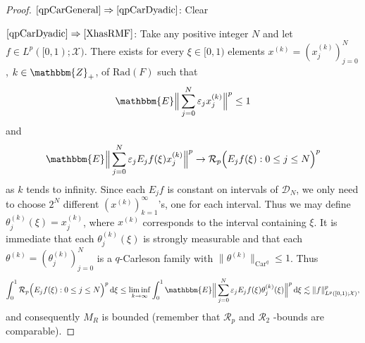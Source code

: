 \documentclass[a4paper,10pt]{amsart}
\theoremstyle{plain}
\theoremstyle{definition}
\theoremstyle{remark}
\begin{document}
\begin{proof}
     $\eqref{qpCarGeneral}\Rightarrow\eqref{qpCarDyadic}$: Clear

    $\eqref{qpCarDyadic}\Rightarrow\eqref{XhasRMF}$: Take any positive integer $N$ and let
    $f\in L^p([0,1) ; \mathcal{X})$. There exists for every $\xi\in [0,1)$ elements
    $x^{(k)} = (x_j^{(k)})_{j=0}^N$, $k\in{\mathbbm{Z}}_+$, of $\text{Rad}(F)$ such that
    \begin{equation*}
      {\mathbbm{E}} \Big\| \sum_{j=0}^N \varepsilon_j x_j^{(k)} \Big\|^p \leq 1
    \end{equation*}
    and
    \begin{equation*}
      {\mathbbm{E}} \Big\| \sum_{j=0}^N \varepsilon_j E_j f(\xi ) x_j^{(k)} \Big\|^p \to
      \mathcal{R}_p \Big( E_j f(\xi ) : 0\leq j \leq N \Big) ^p
    \end{equation*}
    as $k$ tends to infinity. Since each $E_jf$ is constant on intervals of $\mathcal{D}_N$, we only need to choose
    $2^N$ different $(x^{(k)})_{k=1}^{\infty}$'s, one for each interval. Thus we may define
    $\theta_j^{(k)}(\xi ) = x_j^{(k)}$, where $x^{(k)}$ corresponds to the interval containing $\xi$.
    It is immediate that each $\theta_j^{(k)}(\xi )$ is strongly measurable and that each
    $\theta^{(k)} = (\theta_j^{(k)})_{j=0}^N$ is a $q$-Carleson family with $\| \theta^{(k)} \|_{\text{Car}^q} \leq 1$.
    Thus
    \begin{equation*}
      \int_0^1 \mathcal{R}_p \Big( E_j f(\xi) : 0\leq j \leq N \Big)^p {\,\text{d}}\xi
      \leq \liminf_{k\to\infty} \int_0^1 {\mathbbm{E}} \Big\| \sum_{j=0}^N
      \varepsilon_j E_j f (\xi ) \theta_j^{(k)}(\xi ) \Big\|^p {\,\text{d}}\xi
      \lesssim \| f \|_{L^p([0,1) ; \mathcal{X})}^p,
    \end{equation*}
    and consequently $M_R$ is bounded (remember that $\mathcal{R}_p$ and $\mathcal{R}_2$ -bounds are comparable).


\end{proof}
\end{document}
